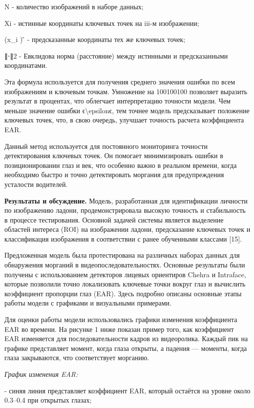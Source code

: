 N - количество изображений в наборе данных;

Xi - истинные координаты ключевых точек на iii-м изображении;

(x\_i ) ̂ - предсказанные координаты тех же ключевых точек;

∥⋅∥2 - Евклидова норма (расстояние) между истинными и предсказанными
координатами.

Эта формула используется для получения среднего значения ошибки по всем
изображениям и ключевым точкам. Умножение на 100100100 позволяет
выразить результат в процентах, что облегчает интерпретацию точности
модели. Чем меньше значение ошибки ϵ\textbackslash epsilonϵ, тем точнее
модель предсказывает положение ключевых точек, что, в свою очередь,
улучшает точность расчета коэффициента EAR.

Данный метод используется для постоянного мониторинга точности
детектирования ключевых точек. Он помогает минимизировать ошибки в
позиционировании глаз и век, что особенно важно в реальном времени,
когда необходимо быстро и точно детектировать моргания для
предупреждения усталости водителей.

{\bfseries Результаты и обсуждение.} Модель, разработанная для
идентификации личности по изображению ладони, продемонстрировала высокую
точность и стабильность в процессе тестирования. Основной задачей
системы является выделение областей интереса (ROI) на изображении
ладони, предсказание ключевых точек и классификация изображения в
соответствии с ранее обученными классами {[}15{]}.

Предложенная модель была протестирована на различных наборах данных для
обнаружения морганий в видеопоследовательностях. Основные результаты
были получены с использованием детекторов лицевых ориентиров Chehra и
Intraface, которые позволили точно локализовать ключевые точки вокруг
глаз и вычислить коэффициент пропорции глаз (EAR). Здесь подробно
описаны основные этапы работы модели с графиками и визуальными
примерами.

Для оценки работы модели использовались графики изменения коэффициента
EAR во времени. На рисунке 1 ниже показан пример того, как коэффициент
EAR изменяется для последовательности кадров из видеоролика. Каждый пик
на графике представляет момент, когда глаза открыты, а падения ---
моменты, когда глаза закрываются, что соответствует морганию.

\emph{График изменения EAR:}

- синяя линия представляет коэффициент EAR, который остаётся на уровне
около 0.3--0.4 при открытых глазах;

